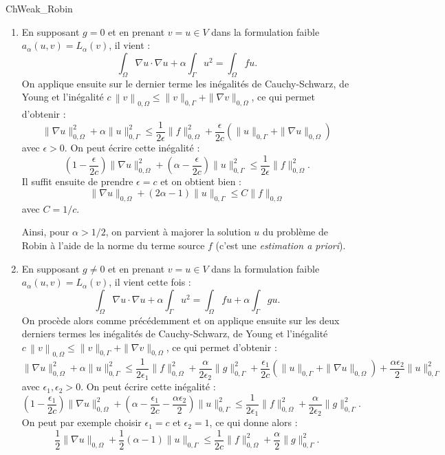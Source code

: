\begin{corrige}{ChWeak_Robin}
\begin{enumerate}
\item En supposant $g=0$ et en prenant $v =u \in V$ dans la formulation faible $a_\alpha ( u , v ) = L_\alpha (v)$, il vient :
\[
\int_\Omega \nabla u \cdot \nabla u 
+ \alpha \int_\Gamma u^2 = \int_\Omega f u .
\]
On applique ensuite sur le dernier terme les inégalités de Cauchy-Schwarz, de Young et 
l'inégalité $c \, \left \| v \right \|_{0,\Omega} \leq \| v \|_{0,\Gamma}+ \| \nabla v \|_{0,\Omega}$, ce qui permet d'obtenir :
\[
\| \nabla u \|^2_{0,\Omega}
+ \alpha \| u \|^2_{0,\Gamma} \leq
\frac1{2\epsilon} \| f \|^2_{0,\Omega} 
+ \frac{\epsilon}{2c} \left (
\| u \|_{0,\Gamma}+ \| \nabla u \|_{0,\Omega}
\right)  
\]
avec $\epsilon > 0$. On peut écrire cette inégalité :
\[
\left ( 1 - \frac{\epsilon}{2c} \right ) 
\| \nabla u \|^2_{0,\Omega}
+ \left ( \alpha - \frac{\epsilon}{2c} \right ) 
\| u \|^2_{0,\Gamma} \leq
\frac1{2\epsilon} \| f \|^2_{0,\Omega} .
\]
Il suffit ensuite de prendre $\epsilon = c$ 
et on obtient bien  :
\[
\| \nabla u \|_{0,\Omega} 
+
(2\alpha - 1 ) \| u \|_{0,\Gamma}
\leq C \| f \|_{0,\Omega}
\]
avec $C = 1/c$.

Ainsi, pour $\alpha > 1/2$, on parvient à majorer la solution $u$ du problème de Robin à l'aide de la norme du terme source $f$ (c'est une \emph{estimation a priori}).

\item En supposant $g\neq0$ et en prenant $v =u \in V$ dans la formulation faible $a_\alpha ( u , v ) = L_\alpha (v)$, il vient cette fois :
\[
\int_\Omega \nabla u \cdot \nabla u 
+ \alpha \int_\Gamma u^2 = \int_\Omega f u + \alpha \int_\Gamma gu.
\]
On procède alors comme précédemment et on applique ensuite sur les deux derniers termes les inégalités de Cauchy-Schwarz, de Young et 
l'inégalité $c \, \left \| v \right \|_{0,\Omega} \leq \| v \|_{0,\Gamma}+ \| \nabla v \|_{0,\Omega}$, ce qui permet d'obtenir :
\[
\| \nabla u \|^2_{0,\Omega}
+ \alpha \| u \|^2_{0,\Gamma} \leq
\frac1{2\epsilon_1} \| f \|^2_{0,\Omega} 
+ \frac{\alpha}{2\epsilon_2} \| g \|^2_{0,\Gamma} 
+ \frac{\epsilon_1}{2c} \left (
\| u \|_{0,\Gamma}+ \| \nabla u \|_{0,\Omega}
\right)  
+ \frac{\alpha\epsilon_2}{2} \| u \|^2_{0,\Gamma}
\]
avec $\epsilon_1 , \epsilon_2 > 0$. On peut écrire cette inégalité :
\[
\left ( 1 - \frac{\epsilon_1}{2c} \right ) 
\| \nabla u \|^2_{0,\Omega}
+ \left ( \alpha - \frac{\epsilon_1}{2c} - \frac{\alpha\epsilon_2}{2} \right ) 
\| u \|^2_{0,\Gamma} \leq
\frac1{2\epsilon_1} \| f \|^2_{0,\Omega} 
+ \frac{\alpha}{2\epsilon_2} \| g \|^2_{0,\Gamma}
.
\]
On peut par exemple choisir $\epsilon_1 = c$ et $\epsilon_2 = 1$, ce qui donne alors :
\[
\frac12
\| \nabla u \|_{0,\Omega} 
+ \frac12
(\alpha - 1 ) \| u \|_{0,\Gamma}
\leq
\frac1{2c} \| f \|^2_{0,\Omega} 
+ \frac{\alpha}{2} \| g \|^2_{0,\Gamma}.
\]

\end{enumerate}

\end{corrige}

